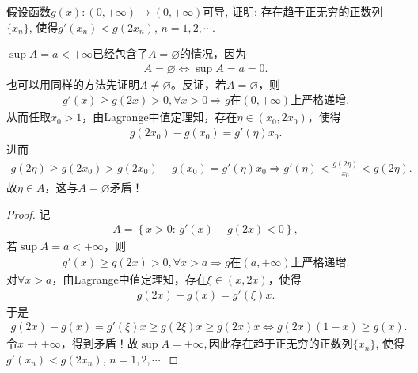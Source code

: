 \documentclass[../../main.tex]{subfiles}%
\begin{document}
\begin{example}
假设函数$g(x): (0,+\infty) \to (0,+\infty)$可导, 证明: 存在趋于正无穷的正数列$\{x_n\}$, 使得$g'(x_n) < g(2x_n)$, $n=1,2,\cdots$.
\end{example}
\begin{remark}
$\sup A=a<+\infty$已经包含了$A=\varnothing$的情况，因为
\begin{align*}
A=\varnothing \Longleftrightarrow \sup A=a=0.
\end{align*}
也可以用同样的方法先证明$A\ne \varnothing$。反证，若$A=\varnothing$，则
\begin{align*}
g'(x) \geqslant g(2x) >0,\forall x>0\Longrightarrow g\text{在}(0,+\infty)\text{上严格递增}.
\end{align*}
从而任取$x_0>1$，由Lagrange中值定理知，存在$\eta \in (x_0,2x_0)$，使得
\begin{align*}
g(2x_0)-g(x_0)=g'(\eta)x_0.
\end{align*}
进而
\begin{align*}
g(2\eta) \geqslant g(2x_0) > g(2x_0)-g(x_0)=g'(\eta)x_0 \Longrightarrow g'(\eta) < \frac{g(2\eta)}{x_0}<g(2\eta).
\end{align*}
故$\eta \in A$，这与$A=\varnothing$矛盾！
\end{remark}
\begin{proof}
记
\begin{align*}
A=\left\{ x>0:\,g'(x)-g(2x) <0 \right\},
\end{align*}
若$\sup A=a<+\infty$，则
\begin{align*}
g'(x) \geqslant g(2x) >0,\forall x>a\Longrightarrow g\text{在}(a,+\infty)\text{上严格递增}.
\end{align*}
对$\forall x>a$，由Lagrange中值定理知，存在$\xi \in (x,2x)$，使得
\begin{align*}
g(2x)-g(x)=g'(\xi)x.
\end{align*}
于是
\begin{align*}
g(2x)-g(x)=g'(\xi)x \geqslant g(2\xi)x \geqslant g(2x)x \Longleftrightarrow g(2x)(1-x) \geqslant g(x).
\end{align*}
令$x\rightarrow +\infty$，得到矛盾！故$\sup A=+\infty,$因此存在趋于正无穷的正数列$\{x_n\}$, 使得$g'(x_n) < g(2x_n)$, $n=1,2,\cdots$.
\end{proof}
\end{document}
